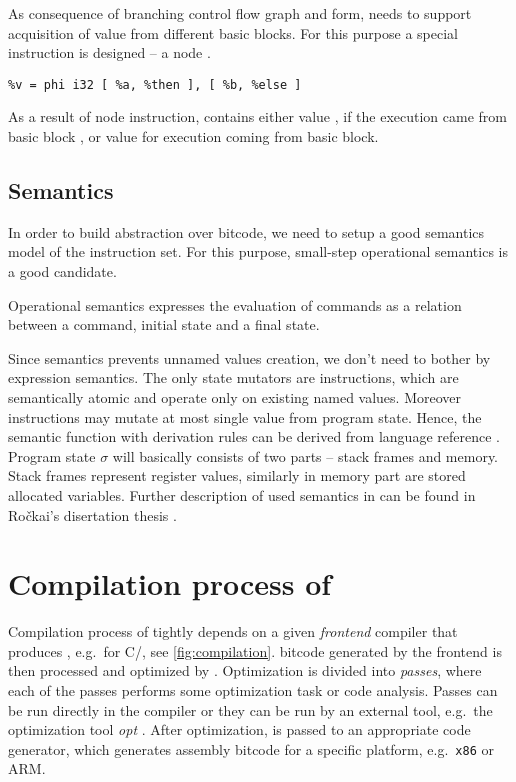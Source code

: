 As consequence of branching control flow graph and \SSA form, \LLVM needs to
support acquisition of value from different basic blocks. For this
purpose a special instruction is designed -- a  node \cite{Cytron91}.

\begin{verbatim}
%v = phi i32 [ %a, %then ], [ %b, %else ]
\end{verbatim}

As a result of  node instruction,  contains either value ,
if the execution came from basic block , or value  for execution
coming from  basic block.

\subsection{Semantics} \label{subsec:semantics}

In order to build abstraction over \LLVM bitcode, we need to setup a good
semantics model of the instruction set. For this purpose, small-step operational
semantics \cite{Plotkin04} is a good candidate.

\begin{definition}
Operational semantics expresses the evaluation of commands as a relation between
a command, initial state and a final state.
\end{definition}

\noindent
Since \LLVMIR semantics prevents unnamed values creation, we don't need to
bother by expression semantics. The only state mutators are instructions, which are
semantically atomic and operate only on existing named values. Moreover
instructions may mutate at most single value from program state. Hence, the
semantic function with derivation rules can be derived from \LLVM
language reference \cite{LLVM:langref}. Program state $\sigma$ will basically
consists of two parts -- stack frames and memory. Stack frames represent
register values, similarly in memory part are stored allocated variables.
Further description of used \LLVM semantics in \DIVINE can be found in Ročkai's
disertation thesis \cite{Rockai15}.

\section{Compilation process of \LLVM} \label{sec:compilation}

Compilation process of \LLVM tightly depends on a given \emph{frontend} compiler that produces
\LLVMIR, e.g.~\clang for C/\Cpp{}, see \autoref{fig:compilation}.
\LLVM bitcode generated by the frontend is then processed and optimized by \LLVM.
Optimization is divided into \LLVM \emph{passes}, where each of the passes
performs some optimization task or code analysis. Passes can be run directly
in the compiler or they can be run by an external tool, e.g.~the \LLVM
optimization tool \emph{opt} \cite{LLVM:opt}. After optimization, \LLVMIR is passed to
an appropriate code generator, which generates assembly bitcode for a specific
platform, e.g.~\texttt{x86} or ARM.

